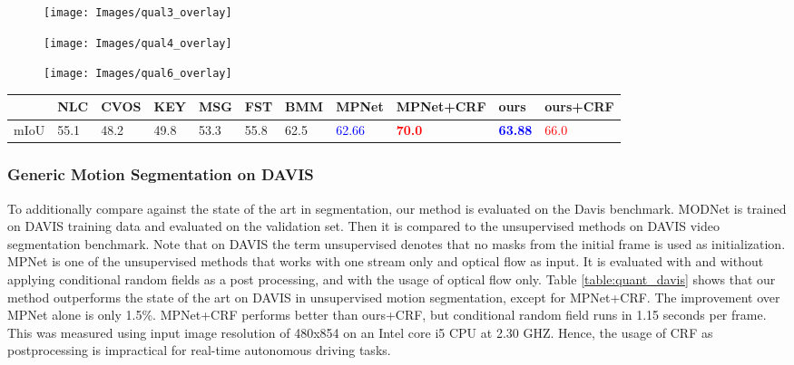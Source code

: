 \documentclass[letterpaper, 10 pt, conference]{ieeeconf}  %
\begin{document}
\begin{figure*}[ht!]
\begin{subfigure}{.3\textwidth}
    \texttt{[image: Images/qual3\_overlay]}
\end{subfigure}%
\begin{subfigure}{.3\textwidth}
    \texttt{[image: Images/qual4\_overlay]}
\end{subfigure}%
\begin{subfigure}{.3\textwidth}
    \texttt{[image: Images/qual6\_overlay]}
\end{subfigure}
    \caption{Qualitative evaluation on DAVIS for our proposed two-stream motion segmentation network. RGB Image, Optical Flow and Overlay Motion mask in green.}
    \label{fig:qual_davis}
\end{figure*}\begin{table*}[ht!]
\centering
\caption{Quantitative evaluation on Davis\cite{perazzi2016} data Val 2016 using mean IoU. Approaches highlighted in blue are without CRF post-processing, and in red after post-processing.}
\label{my-label}
\begin{tabular}{|l|l|l|l|l|l|l|l|l|l|l|}
\hline
 & NLC\cite{faktor2014video} & CVOS\cite{taylor2015causal} & KEY\cite{lee2011key} & MSG\cite{brox2010object} & FST\cite{papazoglou2013fast} & BMM\cite{scott2017motion} & MPNet\cite{tokmakov2016learning} & MPNet\cite{tokmakov2016learning}+CRF & ours & ours+CRF\\ \hline
mIoU & 55.1 & 48.2 & 49.8 & 53.3 & 55.8 & 62.5 & \textcolor{blue}{62.66} & \textcolor{red}{\textbf{70.0}} & \textcolor{blue}{\textbf{63.88}} & \textcolor{red}{66.0} \\ \hline
\end{tabular}
\label{table:quant_davis}
\end{table*}\subsubsection{Generic Motion Segmentation on DAVIS}
     To additionally compare against the state of the art in segmentation, our method is evaluated on the Davis\cite{perazzi2016} benchmark. MODNet is trained on DAVIS training data and evaluated on the validation set. Then it is compared to the unsupervised methods on DAVIS video segmentation benchmark. Note that on DAVIS the term unsupervised denotes that no masks from the initial frame is used as initialization. MPNet is one of the unsupervised methods that works with one stream only and optical flow as input. It is evaluated with and without applying conditional random fields as a post processing, and with the usage of optical flow only. Table \ref{table:quant_davis} shows that our method outperforms the state of the art on DAVIS in unsupervised motion segmentation, except for MPNet+CRF. The improvement over MPNet alone is only 1.5\%. MPNet+CRF performs better than ours+CRF, but conditional random field runs in 1.15 seconds per frame. This was measured using input image resolution of 480x854 on an Intel core i5 CPU at 2.30 GHZ. Hence, the usage of CRF as postprocessing is impractical for real-time autonomous driving tasks. 
\end{document}
